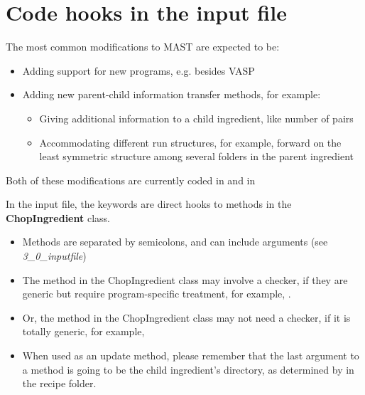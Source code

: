 \documentclass[letterpaper,10pt,english]{sphinxmanual}
\begin{document}
\section{Code hooks in the input file}
\label{12_0_programming:code-hooks-in-the-input-file}
The most common modifications to MAST are expected to be:
\begin{itemize}
\item {} 
Adding support for new programs, e.g. besides VASP

\item {} 
Adding new parent-child information transfer methods, for example:
\begin{itemize}
\item {} 
Giving additional information to a child ingredient, like number of pairs

\item {} 
Accommodating different run structures, for example, forward on the least symmetric structure among several folders in the parent ingredient

\end{itemize}

\end{itemize}

Both of these modifications are currently coded in  and in 

In the input file, the  keywords are direct hooks to methods in the \textbf{ChopIngredient} class.
\begin{itemize}
\item {} 
Methods are separated by semicolons, and can include arguments (see \emph{3\_0\_inputfile})

\item {} 
The method in the ChopIngredient class may involve a checker, if they are generic but require program-specific treatment, for example, .

\item {} 
Or, the method in the ChopIngredient class may not need a checker, if it is totally generic, for example, 

\item {} 
When used as an update method, please remember that the last argument to a method is going to be the child ingredient's directory, as determined by  in the recipe folder.

\end{itemize}
\end{document}

